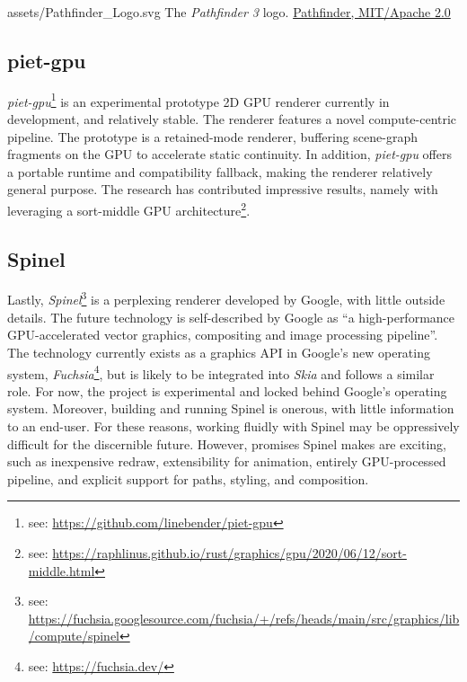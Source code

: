 \smallsvg
{assets/Pathfinder_Logo.svg}
{The \textit{Pathfinder 3} logo.\label{fig:pathfinder_logo}}
{\href{https://github.com/servo/pathfinder}{Pathfinder, MIT/Apache 2.0}}
\medskip

\subsection{piet-gpu}\label{sec:piet-gpu}
\textit{piet-gpu}\footnote{see: \href{https://github.com/linebender/piet-gpu}{https://github.com/linebender/piet-gpu}} is an experimental prototype 2D GPU renderer currently in development, and relatively stable. The renderer features a novel compute-centric pipeline. The prototype is a retained-mode renderer, buffering scene-graph fragments on the GPU to accelerate static continuity. In addition, \textit{piet-gpu} offers a portable runtime and compatibility fallback, making the renderer relatively general purpose. The research has contributed impressive results, namely with leveraging a sort-middle GPU architecture\footnote{see: \href{https://raphlinus.github.io/rust/graphics/gpu/2020/06/12/sort-middle.html}{https://raphlinus.github.io/rust/graphics/gpu/2020/06/12/sort-middle.html}}.

\subsection{Spinel}\label{sec:spinel}

Lastly, \textit{Spinel}\footnote{see: \href{https://fuchsia.googlesource.com/fuchsia/+/refs/heads/main/src/graphics/lib/compute/spinel}{https://fuchsia.googlesource.com/fuchsia/+/refs/heads/main/src/graphics/lib/compute/spinel}} is a perplexing renderer developed by Google, with little outside details. The future technology is self-described by Google as ``a high-performance GPU-accelerated vector graphics, compositing and image processing pipeline''\cite{Spinel}. The technology currently exists as a graphics API in Google's new operating system, \textit{Fuchsia}\footnote{see: \href{https://fuchsia.dev/}{https://fuchsia.dev/}}, but is likely to be integrated into \textit{Skia} and follows a similar role. For now, the project is experimental and locked behind Google's operating system. Moreover, building and running Spinel is onerous, with little information to an end-user. For these reasons, working fluidly with Spinel may be oppressively difficult for the discernible future. However, promises Spinel makes are exciting, such as inexpensive redraw, extensibility for animation, entirely GPU-processed pipeline, and explicit support for paths, styling, and composition\cite{Spinel_Features}.


